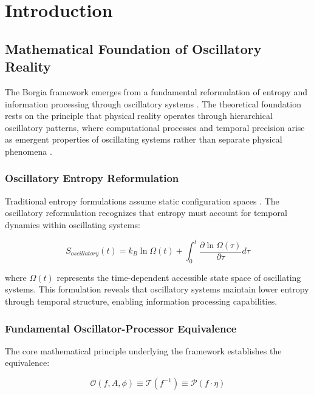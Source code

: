 \section{Introduction}

\subsection{Mathematical Foundation of Oscillatory Reality}

The Borgia framework emerges from a fundamental reformulation of entropy and information processing through oscillatory systems \cite{sachikonye2024oscillatory}. The theoretical foundation rests on the principle that physical reality operates through hierarchical oscillatory patterns, where computational processes and temporal precision arise as emergent properties of oscillating systems rather than separate physical phenomena \cite{sterling2015principles}.

\subsubsection{Oscillatory Entropy Reformulation}

Traditional entropy formulations assume static configuration spaces \cite{landauer1961irreversibility,bennett1982thermodynamics}. The oscillatory reformulation recognizes that entropy must account for temporal dynamics within oscillating systems:

\begin{equation}
S_{oscillatory}(t) = k_B \ln \Omega(t) + \int_0^t \frac{\partial \ln \Omega(\tau)}{\partial \tau} d\tau
\end{equation}

where $\Omega(t)$ represents the time-dependent accessible state space of oscillating systems. This formulation reveals that oscillatory systems maintain lower entropy through temporal structure, enabling information processing capabilities.

\subsubsection{Fundamental Oscillator-Processor Equivalence}

The core mathematical principle underlying the framework establishes the equivalence:

\begin{equation}
\mathcal{O}(f, A, \phi) \equiv \mathcal{T}(f^{-1}) \equiv \mathcal{P}(f \cdot \eta)
\end{equation}

